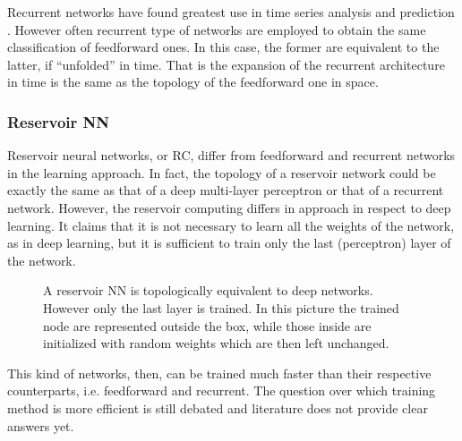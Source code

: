 Recurrent networks have found greatest use in time series analysis and prediction \cite{duda2012pattern}.
However often recurrent type of networks are employed to obtain the same classification of feedforward ones.
In this case, the former are equivalent to the latter, if ``unfolded'' in time.
That is the expansion of the recurrent architecture in time is the same as the topology of the feedforward one in space.

\subsubsection{Reservoir NN}
\label{sssec:Reservoir_NN}
Reservoir neural networks, or \ac{RC}, differ from feedforward and recurrent networks in the learning approach.
In fact, the topology of a reservoir network could be exactly the same as that of a deep multi-layer perceptron or that of a recurrent network.
However, the reservoir computing differs in approach in respect to deep learning.
It claims that it is not necessary to learn all the weights of the network, as in deep learning, but it is sufficient to train only the last (perceptron) layer of the network.

\begin{figure}[ht]
	\centering
	
	\caption{A reservoir NN is topologically equivalent to deep networks. However only the last layer is trained. In this picture the trained node are represented outside the box, while those inside are initialized with random weights which are then left unchanged.}
	\label{fig:reservoirNN}
\end{figure}

\noindent This kind of networks, then, can be trained much faster than their respective counterparts, i.e. feedforward and recurrent.
The question over which training method is more efficient is still debated and literature does not provide clear answers yet.


%

